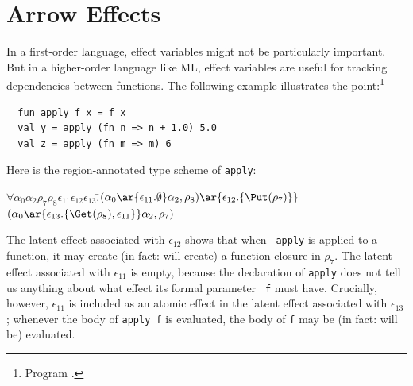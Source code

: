 \documentclass[12pt]{book}
\begin{document}
\section{Arrow Effects}
In a first-order language, effect variables might not be particularly
important.  But in a higher-order language like ML, effect variables
are useful for tracking dependencies between functions. The following
example illustrates the point:\footnote{Program
  .}
\begin{verbatim}
  fun apply f x = f x
  val y = apply (fn n => n + 1.0) 5.0
  val z = apply (fn m => m) 6
\end{verbatim}
Here is the region-annotated type scheme of {\tt apply}:
\begin{tabbing}
\qquad$\forall\alpha_0\alpha_2\rho_7\rho_8\epsilon_{11}\epsilon_{12}\epsilon_{13}.$\=$(\alpha_0
        \ar{\epsilon_{11}.\emptyset}\alpha_2,\rho_8)\ar{\epsilon_{12}.\{\Put(\rho_7)\}}$\\
            \>$(\alpha_0\ar{\epsilon_{13}.\{\Get(\rho_8), \epsilon_{11}\}}\alpha_2,\rho_7)$
\end{tabbing}
The latent effect associated with $\epsilon_{12}$ shows that when {\tt
  apply} is applied to a function, it may create (in fact: will
create) a function closure in $\rho_7$.  The latent effect associated
with $\epsilon_{11}$ is empty, because the declaration of {\tt apply}
does not tell us anything about what effect its formal parameter {\tt
  f} must have. Crucially, however, $\epsilon_{11}$ is included as an
atomic effect in the latent effect associated with $\epsilon_{13}$;
whenever the body of {\tt apply f} is evaluated, the body of {\tt f}
may be (in fact: will be) evaluated.
\end{document}
